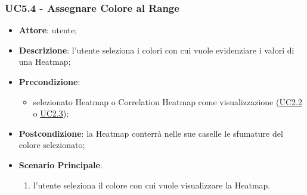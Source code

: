     \subsubsection{UC5.4 - Assegnare Colore al Range}
    \label{uc5.4}
    
    \begin{itemize}
    \item \textbf{Attore}: utente;
    \item \textbf{Descrizione}: l'utente seleziona i colori con cui vuole evidenziare i valori di una Heatmap;
    \item \textbf{Precondizione}: 
    \begin{itemize}
        \item selezionato Heatmap o Correlation Heatmap come visualizzazione (\hyperref[uc2.2]{UC2.2} o \hyperref[uc2.3]{UC2.3});
    \end{itemize}  
    \item \textbf{Postcondizione}: la Heatmap conterrà nelle sue caselle le sfumature del colore selezionato;
    \item \textbf{Scenario Principale}: 
    \begin{enumerate}
        \item l'utente seleziona il colore con cui vuole visualizzare la Heatmap.
    \end{enumerate}  
    \end{itemize}